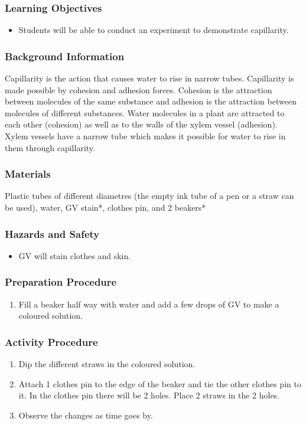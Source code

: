 \subsubsection*{Learning Objectives}
\begin{itemize}
\item{Students will be able to conduct an experiment to demonstrate capillarity.}
\end{itemize}

\subsubsection*{Background Information}
Capillarity is the action that causes water to rise in narrow tubes. Capillarity is made possible by cohesion and adhesion forces. Cohesion is the attraction between molecules of the same substance and adhesion is the attraction between  molecules of different substances. Water molecules in a plant are attracted to each other (cohesion) as well as to the walls of the xylem vessel (adhesion). Xylem vessels have a narrow tube which makes it possible for water to rise in them through capillarity.

\subsubsection*{Materials}
Plastic tubes of different diametres (the empty ink tube of a pen or a straw can be used), water, GV stain*, clothes pin, and 2 beakers*

\subsubsection*{Hazards and Safety}
\begin{itemize}
\item{GV will stain clothes and skin.}
\end{itemize}

\subsubsection*{Preparation Procedure}
\begin{enumerate}
\item{Fill a beaker half way with water and add a few drops of GV to make a coloured solution.}
\end{enumerate}

\subsubsection*{Activity Procedure}
\begin{enumerate}
\item{Dip the different straws in the coloured solution.}
\item{Attach 1 clothes pin to the edge of the beaker and tie the other clothes pin to it. In the clothes pin there will be 2 holes. Place 2 straws in the 2 holes.}
\item{Observe the changes as time goes by.}
\end{enumerate}

